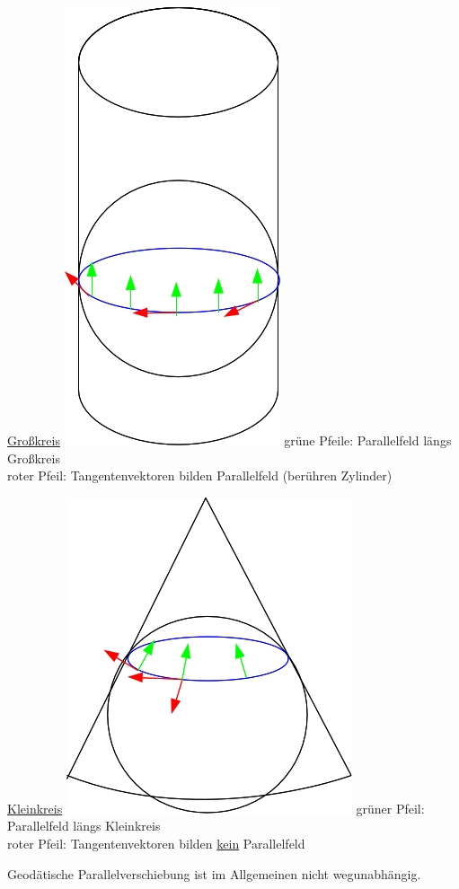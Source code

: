 \begin{bsp}
\uline{Großkreis} \includegraphics[scale=0.2]{Bilder/Bsp11} 
grüne Pfeile: Parallelfeld längs Großkreis \\
roter Pfeil: Tangentenvektoren bilden Parallelfeld (berühren Zylinder) \par
\uline{Kleinkreis} \includegraphics[scale=0.2]{Bilder/Bsp12}
grüner Pfeil: Parallelfeld längs Kleinkreis \\
roter Pfeil: Tangentenvektoren bilden \uline{kein} Parallelfeld \par
Geodätische Parallelverschiebung ist im Allgemeinen nicht wegunabhängig. 

\end{bsp}
